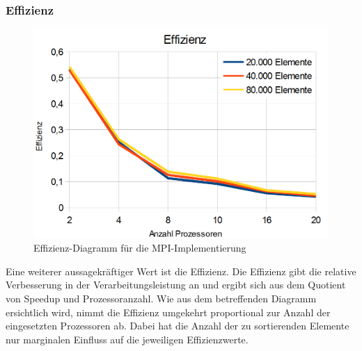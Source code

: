 \documentclass[a4paper,12pt]{scrartcl}
\begin{document}
\subsubsection{Effizienz}
\begin{figure}[htb]
  \begin{center}
    \includegraphics[width=1\hsize]{../effizienz.png}
  \end{center}
  \caption{\label{mpieffizienz}
    Effizienz-Diagramm f\"ur die MPI-Implementierung}
\end{figure}
Eine weiterer aussagekräftiger Wert ist die Effizienz.
Die Effizienz gibt die relative Verbesserung in der Verarbeitungsleistung an und ergibt sich aus dem Quotient von Speedup und Prozessoranzahl.
Wie aus dem betreffenden Diagramm ersichtlich wird, nimmt die Effizienz umgekehrt proportional zur Anzahl der eingesetzten
Prozessoren ab. Dabei hat die Anzahl der zu sortierenden Elemente nur marginalen Einfluss auf die jeweiligen Effizienzwerte. 

\clearpage
\end{document}
